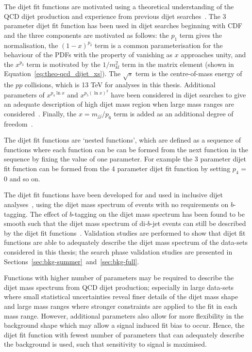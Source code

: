 The dijet fit functions are motivated using a theoretical understanding of the QCD dijet production
and experience from previous dijet searches~\cite{theo-dijet_harris}.
The 3 parameter dijet fit function has been used in dijet searches beginning with CDF~\cite{dijet-CDF_3par}
and the three components are motivated as follows:
the $p_1$ term gives the normalisation,
the $(1-x)^{p_2}$ term is a common parameterisation for the behaviour of the PDFs with the property of vanishing as $x$ approaches unity,
and the $x^{p_3}$ term is motivated by the $1/m_{kl}^2$ term in the matrix element (shown in Equation~\ref{eq:theo-qcd_dijet_xs}).
The $\sqrt{s}$ term is the centre-of-mass energy of the $pp$ collisions, which is 13 TeV for analyses in this thesis.
Additional parameters of $x^{p_4\ln{x}}$ and $x^{p_5(\ln{x})^{2}}$ have been considered in dijet searches to give an adequate description of
high dijet mass region when large mass ranges are considered~\cite{dijet-mori16_paper,dijet-CDF_4par}.
Finally, the $x=m_{jj}/p_6$ term is added as an additional degree of freedom~\cite{det-thesis_kate}.

The dijet fit functions are `nested functions',
which are defined as a sequence of functions where each function can be can be formed from the next function in the sequence by fixing the value of one parameter.
For example the 3 parameter dijet fit function can be formed from the 4 parameter dijet fit function by setting $p_4$ = 0 and so on.

The dijet fit functions have been developed for and used in inclusive dijet analyses~\cite{theo-dijet_harris},
using the dijet mass spectrum of events with no requirements on $b$-tagging.
The effect of $b$-tagging on the dijet mass spectrum has been found to be smooth
such that the dijet mass spectrum of di-$b$-jet events can still be described by the dijet fit functions~\cite{dibjet-mori16_paper}.
Validation studies are performed to show that dijet fit functions are able
to adequately describe the dijet mass spectrum of the data-sets considered in this thesis;
the search phase validation studies are presented in Sections~\ref{sec:bkg-summer}~and~\ref{sec:bkg-full}.

Functions with higher number of parameters may be required to describe the dijet mass spectrum from QCD dijet production;
especially in large data-sets where small statistical uncertainties reveal finer details of the dijet mass shape
and large mass ranges where stronger constraints are applied to the fit in each mass range.
However, additional parameters also allow for more flexibility in the background shape
which may allow a signal induced fit bias to occur.
Hence, the dijet fit function with fewest number of parameters
that can adequately describe the background is used, such that sensitivity to signal is maximised.

